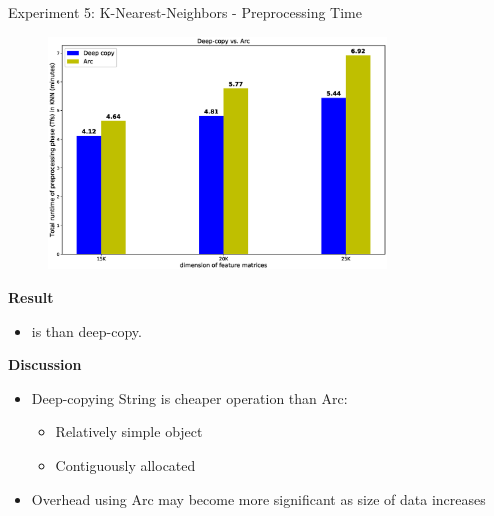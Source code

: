 \documentclass[9pt]{beamer}
\begin{document}
\begin{frame}[fragile]{Experiment 5: K-Nearest-Neighbors - Preprocessing Time}
    \vspace{-0.4cm}
    \begin{figure}[hp]
        \centering
        \begin{center}
                \includegraphics[width=0.8\textwidth]{images/deepcopy_vs_arc.eps}
                \captionsetup{labelformat=empty}
        \end{center}
    \end{figure} 
    \vspace{-0.9cm}
    \textbf{Result}
    \begin{itemize}
        \item {} is  than deep-copy.
    \end{itemize}

    \textbf{Discussion}
    \begin{itemize}
        \item Deep-copying String is cheaper operation than Arc: 
        \begin{itemize}
            \item Relatively simple object
            \item Contiguously allocated
        \end{itemize}
        \item Overhead using Arc may become more significant as size of data increases
    \end{itemize} 
\end{frame}
\end{document}
